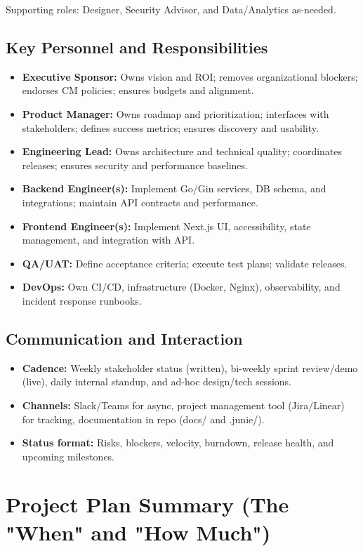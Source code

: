 \documentclass[12pt,a4paper]{article}
\begin{document}
Supporting roles: Designer, Security Advisor, and Data/Analytics as-needed.

\subsection{Key Personnel and Responsibilities}
\begin{itemize}
\item \textbf{Executive Sponsor:} Owns vision and ROI; removes organizational blockers; endorses CM policies; ensures budgets and alignment.
\item \textbf{Product Manager:} Owns roadmap and prioritization; interfaces with stakeholders; defines success metrics; ensures discovery and usability.
\item \textbf{Engineering Lead:} Owns architecture and technical quality; coordinates releases; ensures security and performance baselines.
\item \textbf{Backend Engineer(s):} Implement Go/Gin services, DB schema, and integrations; maintain API contracts and performance.
\item \textbf{Frontend Engineer(s):} Implement Next.js UI, accessibility, state management, and integration with API.
\item \textbf{QA/UAT:} Define acceptance criteria; execute test plans; validate releases.
\item \textbf{DevOps:} Own CI/CD, infrastructure (Docker, Nginx), observability, and incident response runbooks.
\end{itemize}

\subsection{Communication and Interaction}
\begin{itemize}
\item \textbf{Cadence:} Weekly stakeholder status (written), bi-weekly sprint review/demo (live), daily internal standup, and ad-hoc design/tech sessions.
\item \textbf{Channels:} Slack/Teams for async, project management tool (Jira/Linear) for tracking, documentation in repo (docs/ and .junie/).
\item \textbf{Status format:} Risks, blockers, velocity, burndown, release health, and upcoming milestones.
\end{itemize}

\section{Project Plan Summary (The "When" and "How Much")}
\end{document}
